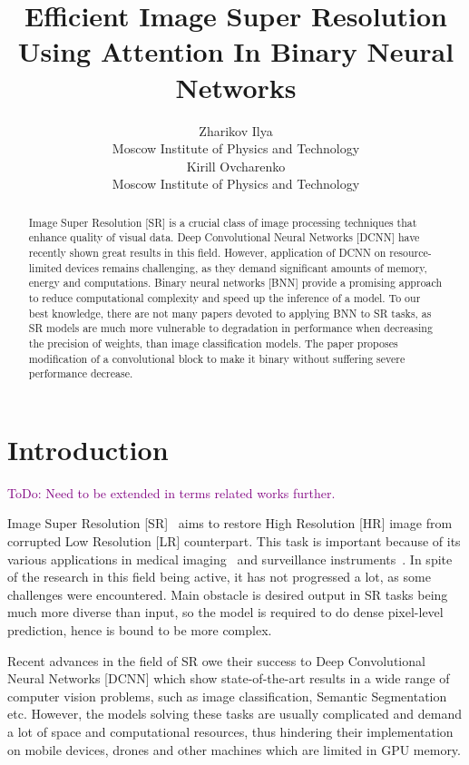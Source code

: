 \documentclass{article}
\title{Efficient Image Super Resolution Using Attention In Binary Neural Networks}
\author{Zharikov Ilya \\
	Moscow Institute of Physics and Technology\\
	\And
	Kirill Ovcharenko \\
	Moscow Institute of Physics and Technology\\
}
\date{}
\newcommand{\TODO}[1]{\textcolor{purple}{ToDo: #1.}}
\begin{document}
\maketitle

\begin{abstract}
Image Super Resolution [SR] is a crucial class of image processing techniques that enhance quality of visual data. 
Deep Convolutional Neural Networks [DCNN] have recently shown great results in this field. However, application of DCNN on resource-limited devices remains challenging, as they demand significant amounts of memory, energy and computations. Binary neural networks [BNN] provide a promising approach to reduce computational complexity and speed up the inference of a model. To our best knowledge, there are not many papers devoted to applying BNN to SR tasks, as SR models are much more vulnerable to degradation in performance when decreasing the precision of weights, than image classification models. The paper proposes modification of a convolutional block to make it binary without suffering severe performance decrease.

\end{abstract}



\section{Introduction}

\TODO{Need to be extended in terms related works further}

Image Super Resolution [SR]~\cite{wang2020deep} aims to restore High Resolution [HR] image from corrupted Low Resolution [LR] counterpart. This task is important because of its various applications in medical imaging~\cite{dharejo2022multimodal} and surveillance instruments~\cite{aakerberg2022real}. In spite of the research in this field being active, it has not progressed a lot, as some challenges were encountered. Main obstacle is desired output in SR tasks being much more diverse than input, so the model is required to do dense pixel-level prediction, hence is bound to be more complex.  

Recent advances in the field of SR owe their success to Deep Convolutional Neural Networks [DCNN] which show state-of-the-art results in a wide range of computer vision problems, such as image classification, Semantic Segmentation etc. However, the models solving these tasks are usually complicated and demand a lot of space and computational resources, thus hindering their implementation on mobile devices, drones and other machines which are limited in GPU memory.
\end{document}
